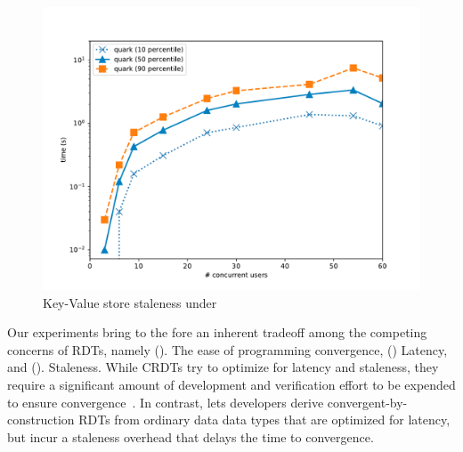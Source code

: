 \begin{figure}[ht]
  \centering
    \includegraphics[scale=0.4]{Figures/rbmonkey_staleness}
  \caption{Key-Value store staleness under \quark}
\label{fig:rb-staleness}
  \vspace*{-0.2in}
\end{figure}

Our experiments bring to the fore an inherent tradeoff among the
competing concerns of RDTs, namely (). The ease of programming
convergence, () Latency, and ().  Staleness. While CRDTs
try to optimize for latency and staleness, they require a significant
amount of development and verification effort to be expended to ensure
convergence~\cite{kleppmann2017}. In contrast, \quark lets developers
derive convergent-by-construction RDTs from ordinary data data types
that are optimized for latency, but incur a staleness overhead that
delays the time to convergence. 


